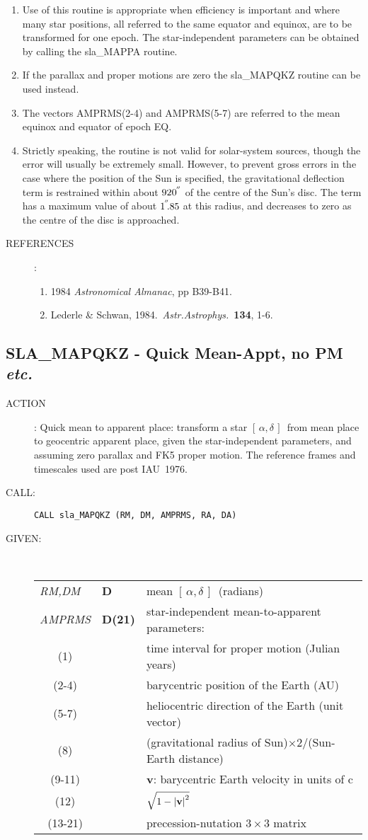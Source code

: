 \documentclass[11pt,twoside]{article}
\newcommand{\xlabel}[1]{}
\newcommand{\radec}     {$[\,\alpha,\delta\,]$}
\newcommand{\arcsec}[2] {\arcseci{#1}$\hspace{-0.4em}.#2$}
\newcommand{\arcsec}[2] {
      {$#1\hspace{-0.05em}^{'\hspace{-0.1em}'}\hspace{-0.4em}.#2$}
   }
\newcommand{\arcseci}[1] {$#1\hspace{-0.05em}$\raisebox{-0.5ex}
                         {$^{'\hspace{-0.1em}'}$}}
\renewcommand{\arcseci}[1] {$#1\hspace{-0.05em}^{'\hspace{-0.1em}'}$}
\newcommand{\routine}[3]
{\hbadness=10000
  \vbox
  {
    \rule{\textwidth}{0.3mm}\\
    {\Large {\bf #1} \hfill #2 \hfill {\bf #1}}\\
    \setlength{\oldspacing}{\topsep}
    \setlength{\topsep}{0.3ex}
    \begin{description}
      #3
    \end{description}
    \setlength{\topsep}{\oldspacing}
  }
}
\renewcommand{\routine}[3]
   {
      \subsection{#1\xlabel{#1} - #2\label{#1}}
       \begin{description}
         #3
       \end{description}
   }
\newcommand{\action}[1]
{\item[ACTION]: #1}
\newcommand{\action}[1]
   {\item[ACTION:] #1}
\newcommand{\call}[1]
{\item[CALL]: \hspace{0.4em}{\tt #1}}
\newlength{\oldspacing}
\renewcommand{\call}[1]
   {
    \item[CALL:] {\tt #1}
   }
\newcommand{\args}[2]
{
  \goodbreak
  \setlength{\oldspacing}{\topsep}
  \setlength{\topsep}{0.3ex}
  \begin{description}
  \item[#1]:\\[1.5ex]
    \begin{tabular}{p{7em}p{6em}p{22em}}
      #2
    \end{tabular}
  \end{description}
  \setlength{\topsep}{\oldspacing}
}
\renewcommand{\args}[2]
   {
     \begin{description}
        \item[#1:]\\
        \begin{tabular}{p{7em}p{6em}l}
           #2
        \end{tabular}
     \end{description}
   }
\newcommand{\spec}[3]
{
  {\em {#1}} & {\bf \mbox{#2}} & {#3}
}
\newcommand{\specel}[2]
{
  \multicolumn{1}{c}{#1} & {} & {#2}
}
\newcommand{\refs}[1]
{
  \goodbreak
  \setlength{\oldspacing}{\topsep}
  \setlength{\topsep}{0.3ex}
  \begin{description}
    \item[REFERENCES]:
        #1
  \end{description}
  \setlength{\topsep}{\oldspacing}
}
\newcommand{\refs}[1]
   {
     \begin{description}
       \item[REFERENCES:]
           #1
     \end{description}
   }
\begin{document}
{
 \begin{enumerate}
  \item Use of this routine is appropriate when efficiency is important
        and where many star positions, all referred to the same equator
        and equinox, are to be transformed for one epoch.  The
        star-independent parameters can be obtained by calling the
        sla\_MAPPA routine.
  \item If the parallax and proper motions are zero the sla\_MAPQKZ
        routine can be used instead.
  \item The vectors AMPRMS(2-4) and AMPRMS(5-7) are referred to
        the mean equinox and equator of epoch EQ.
  \item Strictly speaking, the routine is not valid for solar-system
        sources, though the error will usually be extremely small.
        However, to prevent gross errors in the case where the
        position of the Sun is specified, the gravitational
        deflection term is restrained within about \arcseci{920} of the
        centre of the Sun's disc.  The term has a maximum value of
        about \arcsec{1}{85} at this radius, and decreases to zero as
        the centre of the disc is approached.
 \end{enumerate}
}
\refs
{
 \begin{enumerate}
  \item 1984 {\it Astronomical Almanac}, pp B39-B41.
  \item Lederle \& Schwan, 1984.\ {\it Astr.Astrophys.}\ {\bf 134}, 1-6.
 \end{enumerate}
}
\routine{SLA\_MAPQKZ}{Quick Mean-Appt, no PM {\it etc.}}
{
 \action{Quick mean to apparent place:  transform a star \radec\ from
         mean place to geocentric apparent place, given the
         star-independent parameters, and assuming zero parallax
         and FK5 proper motion.
         The reference frames and timescales used are post IAU~1976.}
 \call{CALL sla\_MAPQKZ (RM, DM, AMPRMS, RA, DA)}
}
\args{GIVEN}
{
 \spec{RM,DM}{D}{mean \radec\ (radians)} \\
 \spec{AMPRMS}{D(21)}{star-independent mean-to-apparent parameters:} \\
 \specel   {(1)}     {time interval for proper motion (Julian years)} \\
 \specel   {(2-4)}   {barycentric position of the Earth (AU)} \\
 \specel   {(5-7)}   {heliocentric direction of the Earth (unit vector)} \\
 \specel   {(8)}     {(gravitational radius of
                      Sun)$\times 2 / $(Sun-Earth distance)} \\
 \specel   {(9-11)}  {{\bf v}: barycentric Earth velocity in units of c} \\
 \specel   {(12)}    {$\sqrt{1-\left|\mbox{\bf v}\right|^2}$} \\
 \specel   {(13-21)} {precession-nutation $3\times3$ matrix}
}
\end{document}
